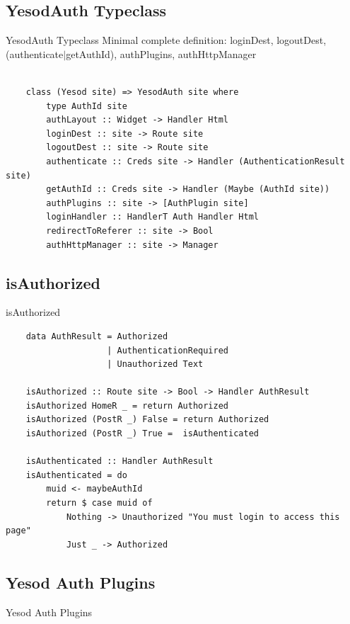 \documentclass[pdf]{beamer}
\begin{document}
\subsection{YesodAuth Typeclass}
\begin{frame}[fragile]{YesodAuth Typeclass}
  Minimal complete definition: loginDest, logoutDest,
  (authenticate$|$getAuthId), authPlugins, authHttpManager \\
  \\
  \begin{verbatim}
    class (Yesod site) => YesodAuth site where
        type AuthId site
        authLayout :: Widget -> Handler Html
        loginDest :: site -> Route site
        logoutDest :: site -> Route site
        authenticate :: Creds site -> Handler (AuthenticationResult site)
        getAuthId :: Creds site -> Handler (Maybe (AuthId site))
        authPlugins :: site -> [AuthPlugin site]
        loginHandler :: HandlerT Auth Handler Html
        redirectToReferer :: site -> Bool
        authHttpManager :: site -> Manager
  \end{verbatim}
\end{frame}

\subsection{isAuthorized}
\begin{frame}[fragile]{isAuthorized}
  \begin{verbatim}
    data AuthResult = Authorized
                    | AuthenticationRequired
                    | Unauthorized Text

    isAuthorized :: Route site -> Bool -> Handler AuthResult
    isAuthorized HomeR _ = return Authorized
    isAuthorized (PostR _) False = return Authorized
    isAuthorized (PostR _) True =  isAuthenticated

    isAuthenticated :: Handler AuthResult
    isAuthenticated = do
        muid <- maybeAuthId
        return $ case muid of
            Nothing -> Unauthorized "You must login to access this page"
            Just _ -> Authorized
  \end{verbatim}
\end{frame}

\subsection{Yesod Auth Plugins}
\begin{frame}{Yesod Auth Plugins}

\end{frame}
\end{document}
